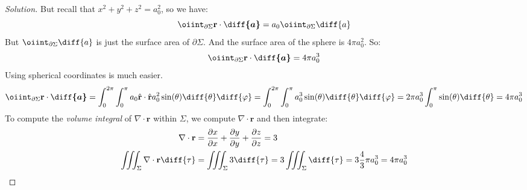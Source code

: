 \documentclass[crop=false,class=book,oneside]{standalone}
\begin{document}
\begin{proof}[Solution]
                But recall that $x^{2}+y^{2}+z^{2}=a_{0}^{2}$,
                so we have:
                \begin{equation*}
                    \oiint_{\partial\Sigma}\mathbf{r}
                    \cdot\boldsymbol{\diff{a}}
                    =a_{0}\oiint_{\partial\Sigma}\diff{a}\\
                \end{equation*}
                But $\oiint_{\partial\Sigma}\diff{a}$
                is just the surface area of $\partial\Sigma$.
                And the surface area of the sphere
                is $4\pi{a_{0}^{2}}$. So:
                \begin{equation*}
                    \oiint_{\partial\Sigma}
                    \mathbf{r}\cdot\boldsymbol{\diff{a}}
                    =4\pi{a_{0}^{3}}
                \end{equation*}
                Using spherical coordinates is much easier.
                \begin{equation*}
                    \oiint_{\partial\Sigma}
                    \mathbf{r}\cdot\boldsymbol{\diff{a}}
                    =\int_{0}^{2\pi}\int_{0}^{\pi}a_{0}
                    \hat{\mathbf{r}}\cdot
                    \hat{\mathbf{r}}a_{0}^{2}
                    \sin(\theta)\diff{\theta}\diff{\varphi}
                    =\int_{0}^{2\pi}\int_{0}^{\pi}a_{0}^{3}
                    \sin(\theta)\diff{\theta}\diff{\varphi}
                    =2\pi a_{0}^{3}\int_{0}^{\pi}
                    \sin(\theta)\diff{\theta}=4\pi{a_{0}^{3}}
                \end{equation*}
                To compute the \textit{volume integral} of
                $\nabla\cdot\mathbf{r}$ within $\Sigma$,
                we compute $\nabla\cdot\mathbf{r}$
                and then integrate:
                \begin{align*}
                    \nabla\cdot\mathbf{r}
                    &=\frac{\partial{x}}{\partial{x}}
                    +\frac{\partial{y}}{\partial{y}}
                    +\frac{\partial{z}}{\partial{z}}=3\\
                    \iiint_{\Sigma}
                    \nabla\cdot\mathbf{r}\diff{\tau}
                    &=\iiint_{\Sigma}3\diff{\tau}
                     =3\iiint_{\Sigma}\diff{\tau}
                     =3\frac{4}{3}\pi{a_{0}^{3}}
                     =4\pi{a_{0}^{3}}
                \end{align*}
            \end{proof} 
\end{document}
